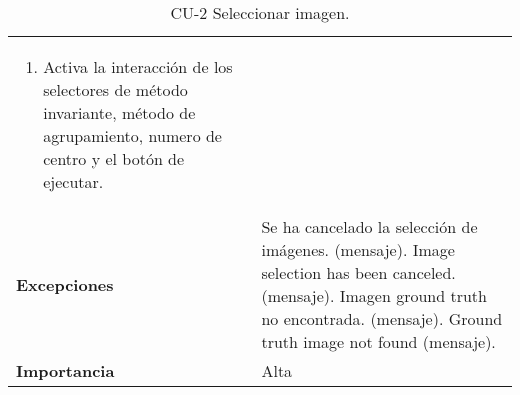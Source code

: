 \begin{table}[p]
\begin{tabularx}{\linewidth}{ p{} p{} }
\begin{enumerate}
                \item Activa la interacción de los selectores de método invariante, método de agrupamiento, numero de centro y el botón de ejecutar.
            \end{enumerate}\\
		\textbf{Excepciones}          & Se ha cancelado la selección de imágenes. (mensaje).\newline
                                        Image selection has been canceled. (mensaje).\newline
                                        Imagen ground truth no encontrada. (mensaje).\newline
                                        Ground truth image not found (mensaje). \\
		\textbf{Importancia}          & Alta \\
		\bottomrule
	\end{tabularx}
	\caption{CU-2 Seleccionar imagen.}
\end{table}

